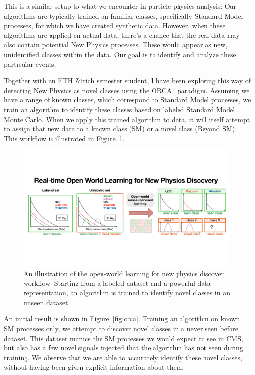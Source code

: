 \documentclass[12pt]{iopart}
\begin{document}
This is a similar setup to what we encounter in particle physics analysis: Our algorithms are typically trained on familiar classes, specifically Standard Model processes, for which we have created synthetic data. However, when these algorithms are applied on actual data, there's a chance that the real data may also contain potential New Physics processes. These would appear as new, unidentified classes within the data. Our goal is to identify and analyze these particular events.

Together with an ETH Zürich semester student, I have been exploring this way of detecting New Physics as novel classes using the ORCA~\cite{DBLP:journals/corr/abs-2102-03526} paradigm. Assuming we have a range of known classes, which correspond to Standard Model processes, we train an algorithm to identify these classes based on labeled Standard Model Monte Carlo. When we apply this trained algorithm to data, it will itself attempt to assign that new data to a known class (SM) or a novel class (Beyond SM). This workflow is illustrated in Figure~\ref{fig:ow}.
\begin{figure}[ht!]
    \centering
    \includegraphics[width=0.99\textwidth]{figures/ow_np.pdf}
    \caption{An illustration of the open-world learning for new physics discover workflow. Starting from a labeled dataset and a powerful data representation, an algorithm is trained to identify novel classes in an unseen dataset}
    \label{fig:ow}
\end{figure}

An initial result is shown in Figure~\ref{fig:orca}. Training an algorithm on known SM processes only, we attempt to discover novel classes in a never seen before dataset. This dataset mimics the SM processes we would expect to see in CMS, but also has a few novel signals injected that the algorithm has not seen during training. We observe that we are able to accurately identify these novel classes, without having been given explicit information about them.
\end{document}
